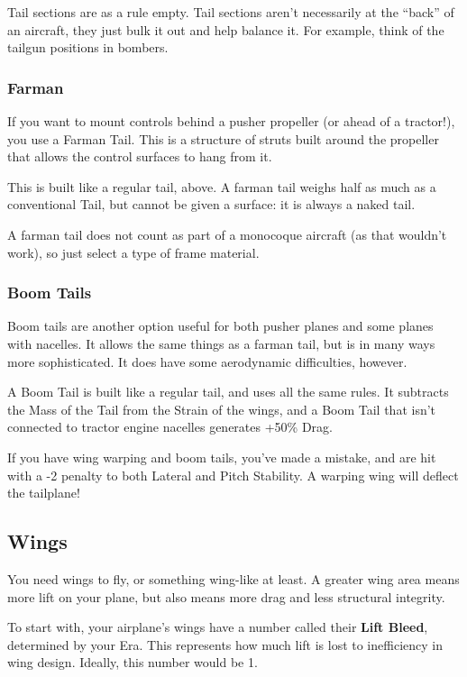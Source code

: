\documentclass{article}
\begin{document}
Tail sections are as a rule empty. Tail sections aren't
necessarily at the ``back'' of an aircraft, they just bulk it out and
help balance it. For example, think of the tailgun positions in
bombers.

\subsubsection{Farman}
\label{_Farman}

If you want to mount controls behind a pusher propeller (or ahead of a
tractor!), you use a Farman Tail. This is a structure of struts built
around the propeller that allows the control surfaces to hang from it.

This is built like a regular tail, above. A farman tail weighs half as
much as a conventional Tail, but cannot be given a surface: it is always
a naked tail.

A farman tail does not count as part of a monocoque aircraft (as that
wouldn't work), so just select a type of frame material.

\subsubsection{Boom Tails}
\label{_Boom Tails}

Boom tails are another option useful for both pusher planes and some
planes with nacelles. It allows the same things as a farman tail, but is
in many ways more sophisticated. It does have some aerodynamic
difficulties, however.

A Boom Tail is built like a regular tail, and uses all the same rules.
It subtracts the Mass of the Tail from the Strain of the wings, and a
Boom Tail that isn't connected to tractor engine nacelles generates
+50\% Drag.

If you have wing warping and boom tails, you've made a mistake, and are
hit with a -2 penalty to both Lateral and Pitch Stability. A warping
wing will deflect the tailplane!

\subsection{Wings}
\label{_Wings}

You need wings to fly, or something wing-like at least. A greater wing
area means more lift on your plane, but also means more drag and less
structural integrity.

To start with, your airplane's wings have a number called their
\textbf{Lift Bleed}, determined by your Era. This represents how much
lift is lost to inefficiency in wing design. Ideally, this number would
be 1.
\end{document}
